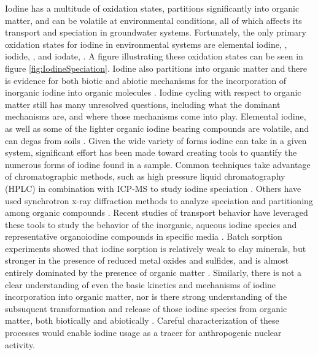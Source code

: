 \documentclass[twoside,12pt,titlepage]{article}
\begin{document}
\par Iodine has a multitude of oxidation states, partitions significantly into organic matter, and can be volatile at environmental conditions, all of which affects its transport and speciation in groundwater systems. Fortunately, the only primary oxidation states for iodine in environmental systems are elemental iodine, , iodide, , and iodate,  \cite{Hou2009}. A figure illustrating these oxidation states can be seen in figure \ref{fig:IodineSpeciation}. Iodine also partitions into organic matter and there is evidence for both biotic and abiotic mechanisms for the incorporation of inorganic iodine into organic molecules \cite{Gilfedder2010, Yamaguchi2008}. Iodine cycling with respect to organic matter still has many unresolved questions, including what the dominant mechanisms are, and where those mechanisms come into play. Elemental iodine, as well as some of the lighter organic iodine bearing compounds are volatile, and can degas from soils \cite{Hu2009}. Given the wide variety of forms iodine can take in a given system, significant effort has been made toward creating tools to quantify the numerous forms of iodine found in a sample. Common techniques take advantage of chromatographic methods, such as high pressure liquid chromatography (HPLC) in combination with ICP-MS to study iodine speciation \cite{Wuilloud2005}. Others have used synchrotron x-ray diffraction methods to analyze speciation and partitioning among organic compounds \cite{Yamaguchi2008}. Recent studies of transport behavior have leveraged these tools to study the behavior of the inorganic, aqueous iodine species and representative organoiodine compounds in specific media \cite{Hu2005}. Batch sorption experiments showed that iodine sorption is relatively weak to clay minerals, but stronger in the presence of reduced metal oxides and sulfides, and is almost entirely dominated by the presence of organic matter \cite{Assemi1994,Fuhrmann1998}. Similarly, there is not a clear understanding of even the basic kinetics and mechanisms of iodine incorporation into organic matter, nor is there strong understanding of the subsuquent transformation and release of those iodine species from organic matter, both biotically and abiotically \cite{Yamaguchi2008,Kaplan2014}. Careful characterization of these processes would enable iodine usage as a tracer for anthropogenic nuclear activity.
\end{document}
